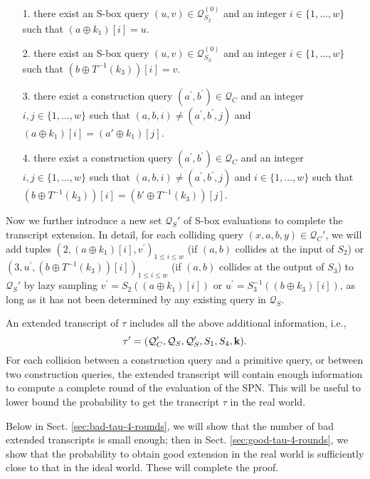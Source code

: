 \begin{itemize}
	\item[1.]
	there exist an S-box query $(u,v)\in\mathcal{Q}_{S_2}^{(0)}$ and an integer $i \in\{1, \ldots, w\}$ such that $\left(a \oplus k_1\right)[i]=u$.
	\item[2.]
	there exist an S-box query $(u,v)\in\mathcal{Q}_{S_3}^{(0)}$ and an integer $i \in\{1, \ldots, w\}$ such that $\left(b \oplus T^{-1}(k_3)\right)[i]=v$.
	\item[3.] there exist a construction query $\left(a^{\prime}, b^{\prime}\right) \in \mathcal{Q}_{C}$ and an integer $i,j \in\{1, \ldots, w\}$ such that $(a, b, i) \neq\left(a^{\prime}, b^{\prime}, j\right)$ and $\left(a \oplus k_1\right)[i] = \left(a' \oplus k_1\right)[j]$.
	\item[4.] there exist a construction query $\left(a^{\prime}, b^{\prime}\right) \in \mathcal{Q}_{C}$ and an integer $i,j \in\{1, \ldots, w\}$ such that $(a, b, i) \neq\left(a^{\prime}, b^{\prime}, j\right)$ and $i \in\{1, \ldots, w\}$ such that $\left(b \oplus T^{-1}(k_3)\right)[i] = \left(b' \oplus T^{-1}(k_3)\right)[j]$.
\end{itemize}
%
%
Now we further introduce a new set $\mathcal{Q}_{S}'$ of S-box evaluations to complete the transcript extension. In detail, for each colliding query $(x,a,b,y)\in\mathcal{Q}_C'$, we will add tuples $\left(2, (a \oplus k_1)[i], v^{\prime}\right)_{1 \leq i \leq w}$ (if $(a, b)$ collides at the input of $S_2$) or $\left(3, u^{\prime}, (b \oplus T^{-1}(k_3))[i]\right)_{1 \leq i \leq w}$ (if $(a, b)$ collides at the output of $S_3$) to $\mathcal{Q}_{S}'$ by lazy sampling $v^{\prime}=S_2(\left(a \oplus k_1\right)[i])$ or $u^{\prime}=S_3^{-1}(\left(b \oplus k_3\right)[i])$, as long as it has not been determined by any existing query in $\mathcal{Q}_S$.


An extended transcript of $\tau$ includes all the above additional information, i.e.,
%
$$\tau'=(\mathcal{Q}_{C}',\mathcal{Q}_{S},\mathcal{Q}_{S}',S_1,S_4,\mathbf{k}).$$
%
For each collision between a construction query and a primitive query, or between two construction queries, the extended transcript will contain enough information to compute a complete round of the evaluation of the SPN. This will be useful to lower bound the probability to get the transcript $\tau$ in the real world.


Below in Sect. \ref{sec:bad-tau-4-rounds}, we will show that the number of bad extended transcripts is small enough; then in Sect. \ref{sec:good-tau-4-rounds}, we show that the probability to obtain good extension in the real world is sufficiently close to that in the ideal world. These will complete the proof.





